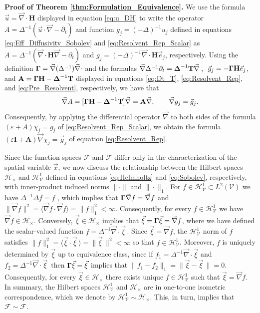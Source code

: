 \documentclass[11pt]{amsart}
\newcommand{\Tb}{\mathbf{T}}
\newcommand{\Hb}{\mathbf{H}}
\newcommand{\Ib}{\mathbf{I}}
\newcommand{\Ab}{\mathbf{A}}
\newcommand{\Vc}{\mathcal{V}}
\newcommand{\Hc}{\mathcal{H}}
\newcommand{\Fc}{\mathcal{F}}
\newcommand{\Hs}{\mathscr{H}}
\newcommand{\Fs}{\mathscr{F}}
\newcommand\bDelta{\mbox{\boldmath${\Delta}$}}
\newcommand\bGamma{\mbox{\boldmath${\Gamma}$}}
\begin{document}
\textbf{Proof of Theorem \ref{thm:Formulation_Equivalence}.}\hspace{1ex}
%
We use the formula $\vec{u}=\vec{\nabla}\cdot\Hb$ displayed in equation
\eqref{eq:u_DH} to write the operator $A=\Delta^{-1}(\vec{u}\cdot\vec{\nabla}-\partial_t)$
and function $g_j=(-\Delta)^{-1}u_j$ defined in equations
\eqref{eq:Eff_Diffusivity_Sobolev} and \eqref{eq:Resolvent_Rep_Scalar}
as $A=\Delta^{-1}(\vec{\nabla}\cdot\Hb\vec{\nabla}-\partial_t)$ and
$g_j=(-\Delta)^{-1}\vec{\nabla}\cdot\Hb\vec{e}_j$, respectively. Using the definition
$\bGamma=\vec{\nabla}(\Delta^{-1})\vec{\nabla}\cdot$ and the formulas
$\vec{\nabla}\Delta^{-1}\partial_t=\bDelta^{-1}\Tb\vec{\nabla}\,$,
$\;\vec{g}_j=-\bGamma\Hb\vec{e}_j$, and $\Ab=\bGamma\Hb-\bDelta^{-1}\Tb$
displayed in equations \eqref{eq:Dt_T}, \eqref{eq:Resolvent_Rep}, and
\eqref{eq:Pre_Resolvent}, respectively, we have that   
%
\begin{align}\label{eq:A_Ab_Relation}
  \vec{\nabla}A=[\bGamma\Hb-\bDelta^{-1}\Tb]\vec{\nabla}=\Ab\vec{\nabla}, \qquad
  \vec{\nabla}g_j=\vec{g}_j.
\end{align}
%
Consequently, by applying the
differential operator $\vec{\nabla}$ to both sides of the formula
$(\varepsilon+A)\chi_j=g_j$ of \eqref{eq:Resolvent_Rep_Scalar}, we obtain the
formula  $(\varepsilon\Ib+\Ab)\vec{\nabla}\chi_j=\vec{g}_j$ of equation
\eqref{eq:Resolvent_Rep}.



Since the function spaces $\Fc$ and $\Fs$ differ
only in the characterization of the spatial variable $\vec{x}$, we now
discuss the relationship between the Hilbert spaces $\Hs_\times$ and
$\Hc^1_{\Vc}$ defined in equations \eqref{eq:Helmholtz} and
\eqref{eq:Sobolev}, respectively, with inner-product induced norms
$\|\cdot\|$ and $\|\cdot\|_1$. For $f\in\Hc^1_{\Vc}\subset L^2(\Vc)$ we have 
$\Delta^{-1}\Delta f=f$ \cite{Stakgold:BVP:2000}, which implies that
$\bGamma\vec{\nabla}f=\vec{\nabla}f$ and
$\|\vec{\nabla}f\|^2=\langle\vec{\nabla}f\cdot\vec{\nabla}f\rangle=\|f\|_1^2<\infty$. Consequently, for every  
$f\in\Hc^1_{\Vc}$ we have $\vec{\nabla}f\in\Hs_\times$. Conversely,
$\vec{\xi}\in\Hs_\times$ implies that $\vec{\xi}=\bGamma\vec{\xi}=\vec{\nabla}f$, where
we have defined the scalar-valued function
$f=\Delta^{-1}\vec{\nabla}\cdot\vec{\xi}\,$. Since $\vec{\xi}=\vec{\nabla}f$, the
$\Hc^1_{\Vc}$ norm of $f$ satisfies
$\|f\|_1^2=\langle\vec{\xi}\cdot\vec{\xi}\,\rangle=\|\vec{\xi}\,\|^2<\infty$ so that
$f\in\Hc^1_{\Vc}$. Moreover, $f$ is uniquely determined by $\vec{\xi}$ up
to equivalence class, since if $f_1=\Delta^{-1}\vec{\nabla}\cdot\vec{\xi}$ and
$f_2=\Delta^{-1}\vec{\nabla}\cdot\vec{\xi}\,$ then $\bGamma\vec{\xi}=\vec{\xi}$ implies
that $\|f_1-f_2\|_1=\|\vec{\xi}-\vec{\xi}\,\|=0$. Consequently, for every  
$\vec{\xi}\in\Hs_\times$ there exists unique $f\in\Hc^1_{\Vc}$ such that
$\vec{\xi}=\vec{\nabla}f$.  In summary, the Hilbert spaces $\Hc^1_{\Vc}$ and
$\Hs_\times$ are in one-to-one isometric correspondence, which we denote by
$\Hc^1_{\Vc}\sim\Hs_\times$. This, in turn, implies that $\Fc\sim\Fs$.  
\end{document}
